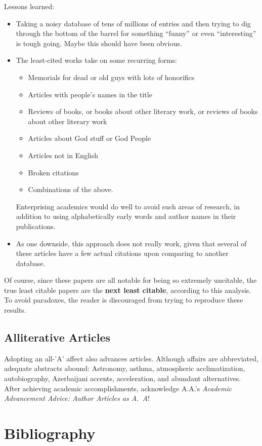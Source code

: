 \documentclass[twocolumn]{article}
\begin{document}
Lessons learned:
\begin{itemize}
\item Taking a noisy database of tens of millions of entries and then
  trying to dig through the bottom of the barrel for something
  ``funny'' or even ``interesting'' is tough going. Maybe this should
  have been obvious.
\item The least-cited works take on some recurring forms:
  \begin{itemize}
  \item Memorials for dead or old guys with lots of honorifics
  \item Articles with people's names in the title
  \item Reviews of books, or books about other literary work, or reviews of books about other literary work
  \item Articles about God stuff or God People
  \item Articles not in English
  \item Broken citations
  \item Combinations of the above.
  \end{itemize}
  Enterprising academics would do well to avoid such areas of research, in addition
  to using alphabetically early words and author names in their publications.
  
\item As one downside, this approach does not really work, given
  that several of these articles have a few actual citations upon
  comparing to another database.
\end{itemize}


\medskip
Of course, since these papers are all notable for being so extremely
uncitable, the true least citable papers are the {\bf next least
  citable}, according to this analysis. To avoid paradoxes, the
reader is discouraged from trying to reproduce these results.


\subsection{Alliterative Articles}

Adopting an all-'A' affect also advances articles. Although affairs
are abbreviated, adequate abstracts abound: Astronomy, asthma,
atmospheric acclimatization, autobiography, Azerbaijani accents,
acceleration, and abundant alternatives. After achieving academic
accomplishments, acknowledge A.A.'s {\it Academic Advancement Advice:
  Author Articles as A.~A}!

\section{Bibliography}



\end{document}
